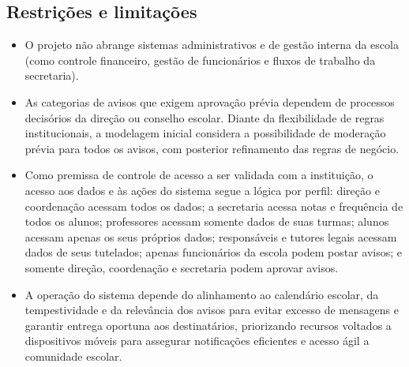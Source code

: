 \documentclass[a4paper,12pt]{report}
\begin{document}
\subsection{Restrições e limitações}
\begin{itemize}
    \item O projeto não abrange sistemas administrativos e de gestão interna da escola (como controle financeiro, gestão de funcionários e fluxos de trabalho da secretaria).
    \item As categorias de avisos que exigem aprovação prévia dependem de processos decisórios da direção ou conselho escolar. Diante da flexibilidade de regras institucionais, a modelagem inicial considera a possibilidade de moderação prévia para todos os avisos, com posterior refinamento das regras de negócio.
    \item Como premissa de controle de acesso a ser validada com a instituição, o acesso aos dados e às ações do sistema segue a lógica por perfil: direção e coordenação acessam todos os dados; a secretaria acessa notas e frequência de todos os alunos; professores acessam somente dados de suas turmas; alunos acessam apenas os seus próprios dados; responsáveis e tutores legais acessam dados de seus tutelados; apenas funcionários da escola podem postar avisos; e somente direção, coordenação e secretaria podem aprovar avisos.
    \item A operação do sistema depende do alinhamento ao calendário escolar, da tempestividade e da relevância dos avisos para evitar excesso de mensagens e garantir entrega oportuna aos destinatários, priorizando recursos voltados a dispositivos móveis para assegurar notificações eficientes e acesso ágil a comunidade escolar.
\end{itemize}
\end{document}

